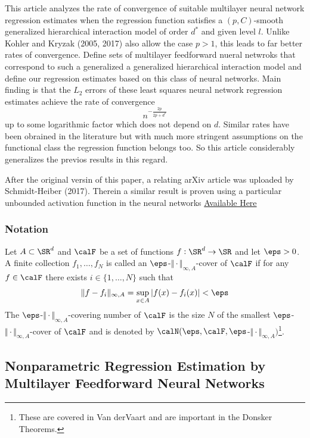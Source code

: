This article analyzes the rate of convergence of suitable multilayer neural network regression estimates when the regression function satisfies a $(p,C)$-smooth generalized hierarchical interaction model of order $d^*$ and given level $l$. Unlike Kohler and Kryzak (2005, 2017) also allow the case $p > 1$, this leads to far better rates of convergence. Define sets of multilayer feedforward nueral netwroks that correspond to such a generalized a generalized hierarchical interaction model and define our regression estimates based on this class of neural networks. Main finding is that the $L_2$ errors of these least squares neural network regression estimates achieve the rate of convergence 
\[n^{-\frac{2p}{2p + d^*}}\]
up to some logarithmic factor which does not depend on $d$. Similar rates have been obrained in the literature but with much more stringent assumptions on the functional class the regression function belongs too. So this article considerably generalizes the previos results in this regard.

After the original versin of this paper, a relating arXiv article was uploaded by Schmidt-Heiber (2017). Therein a similar result is proven using a particular unbounded activation function in the neural networks    \href{https://arxiv.org/abs/1708.06633v2}{Available Here}

\subsubsection{Notation}

Let $A\subset \SR^d$ and $\calF$ be a set of functions $f:\SR^d\rightarrow \SR$ and let $\eps > 0$. A finite collection $f_1, \dots, f_N$ is called an $\eps$-$\Vert\cdot\Vert_{\infty, A}$-cover of $\calF$ if for any $f \in \calF$ there exists $i\in \{1, \dots, N\}$ such that 
\[\Vert f - f_i \Vert_{\infty, A} = \sup_{x\in A} |f(x) - f_i(x)| < \eps \]
The $\eps$-$\Vert\cdot\Vert_{\infty, A}$-covering number of $\calF$ is the size $N$ of the smallest $\eps$-$\Vert\cdot\Vert_{\infty, A}$-cover of $\calF$ and is denoted by $\calN(\eps, \calF,\eps$-$\Vert\cdot\Vert_{\infty, A})$\footnote{These are covered in Van derVaart and are important in the Donsker Theorems.}.


\subsection{Nonparametric Regression Estimation by Multilayer Feedforward Neural Networks}

